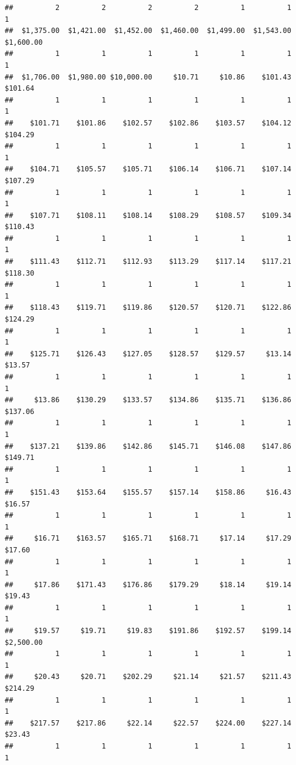 \begin{verbatim}
##          2          2          2          2          1          1          1 
##  $1,375.00  $1,421.00  $1,452.00  $1,460.00  $1,499.00  $1,543.00  $1,600.00 
##          1          1          1          1          1          1          1 
##  $1,706.00  $1,980.00 $10,000.00     $10.71     $10.86    $101.43    $101.64 
##          1          1          1          1          1          1          1 
##    $101.71    $101.86    $102.57    $102.86    $103.57    $104.12    $104.29 
##          1          1          1          1          1          1          1 
##    $104.71    $105.57    $105.71    $106.14    $106.71    $107.14    $107.29 
##          1          1          1          1          1          1          1 
##    $107.71    $108.11    $108.14    $108.29    $108.57    $109.34    $110.43 
##          1          1          1          1          1          1          1 
##    $111.43    $112.71    $112.93    $113.29    $117.14    $117.21    $118.30 
##          1          1          1          1          1          1          1 
##    $118.43    $119.71    $119.86    $120.57    $120.71    $122.86    $124.29 
##          1          1          1          1          1          1          1 
##    $125.71    $126.43    $127.05    $128.57    $129.57     $13.14     $13.57 
##          1          1          1          1          1          1          1 
##     $13.86    $130.29    $133.57    $134.86    $135.71    $136.86    $137.06 
##          1          1          1          1          1          1          1 
##    $137.21    $139.86    $142.86    $145.71    $146.08    $147.86    $149.71 
##          1          1          1          1          1          1          1 
##    $151.43    $153.64    $155.57    $157.14    $158.86     $16.43     $16.57 
##          1          1          1          1          1          1          1 
##     $16.71    $163.57    $165.71    $168.71     $17.14     $17.29     $17.60 
##          1          1          1          1          1          1          1 
##     $17.86    $171.43    $176.86    $179.29     $18.14     $19.14     $19.43 
##          1          1          1          1          1          1          1 
##     $19.57     $19.71     $19.83    $191.86    $192.57    $199.14  $2,500.00 
##          1          1          1          1          1          1          1 
##     $20.43     $20.71    $202.29     $21.14     $21.57    $211.43    $214.29 
##          1          1          1          1          1          1          1 
##    $217.57    $217.86     $22.14     $22.57    $224.00    $227.14     $23.43 
##          1          1          1          1          1          1          1 

\end{verbatim}
